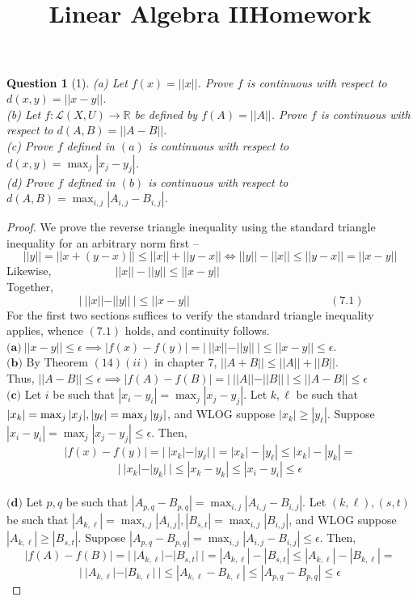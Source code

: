 \documentclass[11pt]{article}
\title{\vspace{-50pt}
\Huge \name
\\\vspace{20pt}
\huge Linear Algebra II\hfill Homework \hw}
\author{}
\date{}
\theoremstyle{quest}
\newtheorem*{question}{Question}
\begin{document}
\maketitle

\begin{question}[1]
(a) Let $f(x) = ||x||$. Prove $f$ is continuous with respect to $d(x,y) = ||x-y||$.
\\(b) Let $f: \mathcal{L}(X, U) \rightarrow \mathbb{R}$ be defined by $f(A) = ||A||$. Prove $f$ is continuous with respect to $d(A, B) = ||A-B||$.
\\(c) Prove $f$ defined in $(a)$ is continuous with respect to $d(x,y) = \max_j |x_j - y_j|$.
\\(d) Prove $f$ defined in $(b)$ is continuous with respect to $d(A, B) = \max_{i,j} |A_{i,j}-B_{i,j}|$.
\end{question}
\begin{proof}
We prove the reverse triangle inequality using the standard triangle inequality for an arbitrary norm first -- $$||y|| = ||x + (y-x)|| \le ||x|| + ||y-x|| \iff ||y|| - ||x|| \le ||y-x|| = ||x-y||$$
Likewise, $\ \ \ \ \ \ \ \ \ \ \ \ \ \ \ \ \ \ \ \ \ \ \ \ ||x|| - ||y|| \le ||x-y||$
\\Together, $\ \ \ \ \ \ \ \ \ \ \ \ \ \ \ \ \ \ \ \ \ \ \ \ \ \ \ \ \ |\ ||x|| - ||y||\ | \le ||x-y||\ \ \ \ \ \ \ \ \ \ \ \ \ \ \ \ \ \ \ \ \ \ \ \ \ \ \ \ \ \ \ \ \ \ \ \ \ \ \ \ \ \ \ \ \ \ \ \ \ \ \ \ \ \ \ \ (7.1)$
\\For the first two sections suffices to verify the standard triangle inequality applies, whence $(7.1)$ holds, and continuity follows.
\\$\textbf{(a)}\ ||x-y|| \le \epsilon \implies |f(x)-f(y)| = |\ ||x|| - ||y||\ | \le ||x-y|| \le \epsilon$.
\\$\textbf{(b)}$ By Theorem $(14)(ii)$ in chapter $7$, $||A + B|| \le ||A|| + ||B||$.
\\Thus, $||A-B|| \le \epsilon \implies |f(A)-f(B)| = |\ ||A||-||B||\ | \le ||A-B|| \le \epsilon$
\\$\textbf{(c)}$ Let $i$ be such that $|x_i - y_i| = \max_j |x_j - y_j|$. Let $k, \ell$ be such that $|x_k| = \max_j|x_j|,\\|y_\ell| = \max_j|y_j|$, and WLOG suppose $|x_k| \ge |y_\ell|$. Suppose $|x_i - y_i| = \max_j |x_j - y_j| \le \epsilon$. Then, $$|f(x)-f(y)| = |\ |x_k| - |y_\ell| \ | = |x_k| - |y_\ell| \le |x_k| - |y_k| =$$ $$|\ |x_k| - |y_k| \ | \le |x_k - y_k| \le |x_i - y_i| \le \epsilon$$
\\$\textbf{(d)}$ Let $p, q$ be such that $|A_{p, q} - B_{p, q}| = \max_{i, j} |A_{i, j} - B_{i, j}|$. Let $(k, \ell), (s, t)$ be such that $|A_{k, \ell}| = \max_{i, j}|A_{i,j}|, |B_{s, t}| = \max_{i, j}|B_{i, j}|$, and WLOG suppose $|A_{k, \ell}| \ge |B_{s, t}|$. Suppose $|A_{p, q} - B_{p, q}| = \max_{i, j} |A_{i, j} - B_{i, j}| \le \epsilon$. Then, $$|f(A)-f(B)| = |\ |A_{k, \ell}| - |B_{s, t}| \ | = |A_{k, \ell}| - |B_{s, t}| \le |A_{k, \ell}| - |B_{k, \ell}| =$$ $$|\ |A_{k, \ell}| - |B_{k, \ell}| \ | \le |A_{k, \ell} - B_{k, \ell}| \le |A_{p, q} - B_{p, q}| \le \epsilon$$
\end{proof}
\end{document}
